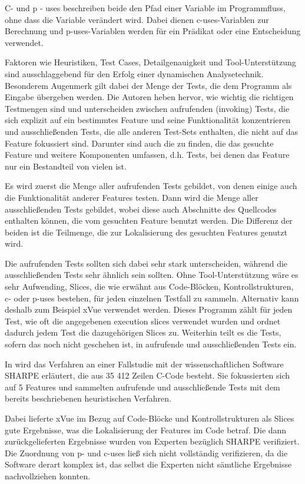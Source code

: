 \documentclass[runningheads,a4paper]{llncs}
\begin{document}
C- und p - uses beschreiben beide den Pfad einer Variable im Programmfluss, ohne dass die Variable verändert wird. Dabei dienen c-uses-Variablen zur Berechnung und p-uses-Variablen werden für ein Prädikat oder eine Entscheidung verwendet.

Faktoren wie Heuristiken, Test Cases, Detailgenauigkeit und Tool-Unterstützung sind ausschlaggebend für den Erfolg einer dynamischen Analysetechnik. Besonderem Augenmerk gilt dabei der Menge der Tests, die dem Programm als Eingabe übergeben werden. Die Autoren heben hervor, wie wichtig die richtigen Testmengen sind und unterscheiden zwischen aufrufenden (invoking) Tests, die sich explizit auf ein bestimmtes Feature und seine Funktionalität konzentrieren und ausschließenden Tests, die alle anderen Test-Sets enthalten, die nicht auf das Feature fokussiert sind. Darunter sind auch die zu finden, die das gesuchte Feature und weitere Komponenten umfassen, d.h. Tests, bei denen das Feature nur ein Bestandteil von vielen ist.

Es wird zuerst die Menge aller aufrufenden Tests gebildet, von denen einige auch die Funktionalität anderer Features testen. Dann wird die Menge aller ausschließenden Tests gebildet, wobei diese auch Abschnitte des Quellcodes enthalten können, die vom gesuchten Feature benutzt werden. Die Differenz der beiden ist die Teilmenge, die zur Lokalisierung des gesuchten Features genutzt wird.

Die aufrufenden Tests sollten sich dabei sehr stark unterscheiden, während die ausschließenden Tests sehr ähnlich sein sollten. Ohne Tool-Unterstützung wäre es sehr Aufwending, Slices, die wie erwähnt aus Code-Blöcken, Kontrollstrukturen, c- oder p-uses bestehen, für jeden einzelnen Testfall zu sammeln. Alternativ kann deshalb zum Beispiel xVue verwendet werden. Dieses Programm zählt für jeden Test, wie oft die angegebenen execution slices verwendet wurden und ordnet dadurch jedem Test die dazugehörigen Slices zu. Weiterhin teilt es die Tests, sofern das noch nicht geschehen ist, in aufrufende und ausschließenden Tests ein.

In \cite{Executionslices} wird das Verfahren an einer Fallstudie mit der wissenschaftlichen Software SHARPE erläutert, die aus 35 412 Zeilen C-Code besteht. Sie fokussierten sich auf 5 Features und sammelten aufrufende und ausschließende Tests mit dem bereits beschriebenen heuristischen Verfahren.

Dabei lieferte xVue im Bezug auf Code-Blöcke und Kontrollstrukturen als Slices gute Ergebnisse, was die Lokalisierung der Features im Code betraf. Die dann zurückgelieferten Ergebnisse wurden von Experten bezüglich SHARPE verifiziert. Die Zuordnung von p- und c-uses ließ sich nicht vollständig verifizieren, da die Software derart komplex ist, das selbst die Experten nicht sämtliche Ergebnisse nachvollziehen konnten.
\end{document}
